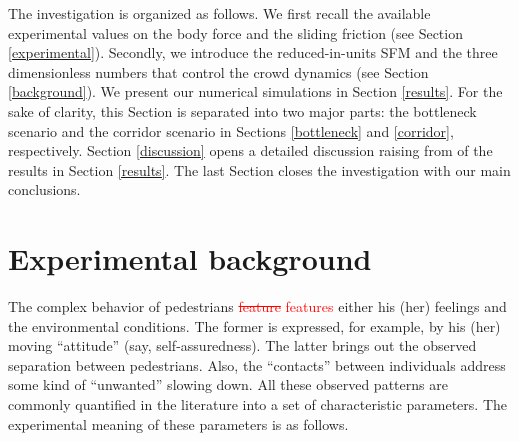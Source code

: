 \documentclass[preprint,12pt]{elsarticle}
\begin{document}
The investigation is organized as follows. We first recall the available 
experimental values on the body force and the sliding friction (see Section 
\ref{experimental}). Secondly, we introduce the reduced-in-units SFM and the 
three dimensionless numbers that control the crowd dynamics (see Section 
\ref{background}). We present our numerical simulations in Section 
\ref{results}. For the sake of clarity, this Section is 
separated into two major parts: the bottleneck scenario and the corridor 
scenario in Sections \ref{bottleneck} and \ref{corridor}, respectively. 
Section \ref{discussion} opens a detailed discussion raising from of the results 
in Section \ref{results}. The last Section closes the investigation with our 
main conclusions.

\section{\label{experimental}Experimental background}

The complex behavior of pedestrians \textcolor{red}{\sout{feature} features}
 either his (her) feelings and 
the environmental conditions. The former is expressed, for example, by his 
(her) moving ``attitude'' (say, self-assuredness). The latter brings out the 
observed separation between pedestrians. Also, the ``contacts'' between 
individuals address some kind of ``unwanted'' slowing down. All these 
observed patterns are commonly quantified in the literature into a set of 
characteristic  parameters. The experimental meaning of these parameters is as 
follows.
\end{document}
